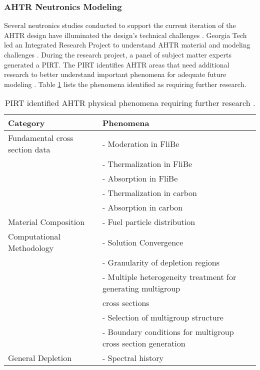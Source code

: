 \subsubsection{AHTR Neutronics Modeling}
Several neutronics studies conducted to support the current iteration of the \gls{AHTR} 
design have illuminated the design's technical challenges 
\cite{ramey_monte_2018,holcomb_fluoride_2013,greene_pre-conceptual_2010}. 
\gls{Georgia Tech} led an Integrated Research Project to understand \gls{AHTR} 
material and modeling challenges \cite{zhang_integrated_2019}. 
During the research project, a panel of subject matter experts 
generated a \gls{PIRT}.
The \gls{PIRT} identifies \gls{AHTR} areas that need additional research to better 
understand important phenomena for adequate future modeling
\cite{rahnema_phenomena_2019}. 
Table \ref{tab:phenomena} lists the phenomena identified as requiring further 
research. 
\begin{table}[htb!]
    \centering
    \onehalfspacing
    \caption{\acrlong{PIRT} identified \acrlong{AHTR} physical phenomena requiring 
    further research \cite{rahnema_phenomena_2019}.}
	\label{tab:phenomena}
    \footnotesize
    \begin{tabular}{l|l}
    \hline
    \textbf{Category} & \textbf{Phenomena} \\ \hline
    Fundamental cross section data & - Moderation in FliBe \\
    & - Thermalization in FliBe \\
    & - Absorption in FliBe \\
    & - Thermalization in carbon \\
    & - Absorption in carbon \\ \hline
    Material Composition & - Fuel particle distribution \\ \hline
    Computational Methodology & - Solution Convergence \\ 
    & - Granularity of depletion regions \\
    & - Multiple heterogeneity treatment for generating multigroup \\ 
    & cross sections \\
    & - Selection of multigroup structure \\
    & - Boundary conditions for multigroup cross section generation \\ \hline 
    General Depletion & - Spectral history \\ \hline 
    \end{tabular}
\end{table}

